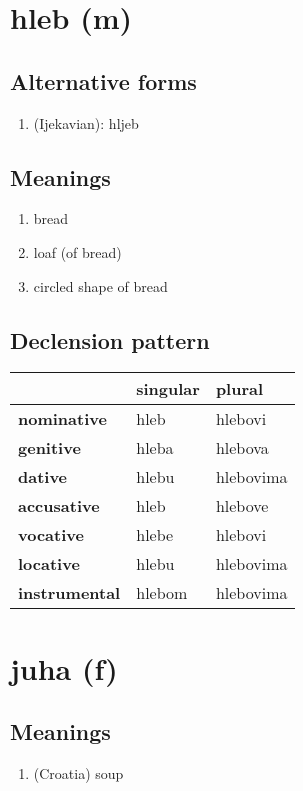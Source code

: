 \filbreak
\section{hleb (m)}
\subsection*{Alternative forms}
\begin{enumerate}
\item (Ijekavian): hljeb
\end{enumerate}
\subsection*{Meanings}
\begin{enumerate}
\item bread
\item loaf (of bread)
\item circled shape of bread
\end{enumerate}
\subsection*{Declension pattern}
\begin{tabularx}{\linewidth}{Xll}
\toprule
{} & singular &     plural \\
\midrule
\textbf{nominative  } &     hleb &    hlebovi \\
\textbf{genitive    } &    hleba &    hlebova \\
\textbf{dative      } &    hlebu &  hlebovima \\
\textbf{accusative  } &     hleb &    hlebove \\
\textbf{vocative    } &    hlebe &    hlebovi \\
\textbf{locative    } &    hlebu &  hlebovima \\
\textbf{instrumental} &   hlebom &  hlebovima \\
\bottomrule
\end{tabularx}

\filbreak
\section{juha (f)}
\subsection*{Meanings}
\begin{enumerate}
\item (Croatia) soup
\end{enumerate}
